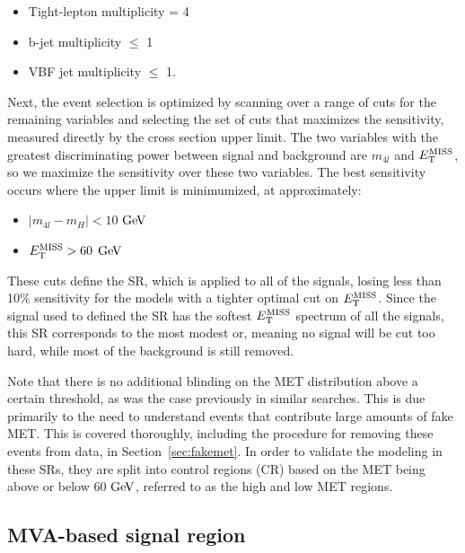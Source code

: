 \begin{itemize}
\item Tight-lepton multiplicity = 4
\item b-jet multiplicity $\leq$ 1
\item VBF jet multiplicity $\leq$ 1.
\end{itemize}

Next, the event selection is optimized by scanning over a range of cuts for the remaining variables and selecting the set of cuts that maximizes the sensitivity, measured directly by the cross section upper limit. The two variables with the greatest discriminating power between signal and background are $m_{4l}$ and $E_{\rm{T}}^{\rm{MISS}}$, so we maximize the sensitivity over these two variables. The best sensitivity occurs where the upper limit is minimumized, at approximately:

\begin{itemize}
\item $|m_{4l} - m_H| < 10$ $\mathrm{Ge\kern -0.1em V}$
\item $E_{\rm{T}}^{\rm{MISS}} > 60$ $\mathrm{Ge\kern -0.1em V}$
\end{itemize}

These cuts define the SR, which is applied to all of the signals, losing less than 10\% sensitivity for the models with a tighter optimal cut on $E_{\rm{T}}^{\rm{MISS}}$. Since the signal used to defined the SR has the softest $E_{\rm{T}}^{\rm{MISS}}$ spectrum of all the signals, this SR corresponds to the most modest or, meaning no signal will be cut too hard, while most of the background is still removed. 


Note that there is no additional blinding on the MET distribution above a certain threshold, as was the case previously in similar searches. This is due primarily to the need to understand events that contribute large amounts of fake MET. This is covered thoroughly, including the procedure for removing these events from data, in Section~\ref{sec:fakemet}. In order to validate the modeling in these SRs, they are split into control regions (CR) based on the MET being above or below 60 $\mathrm{Ge\kern -0.1em V}$, referred to as the high and low MET regions. 


\subsection{MVA-based signal region} \label{mvaopt}

